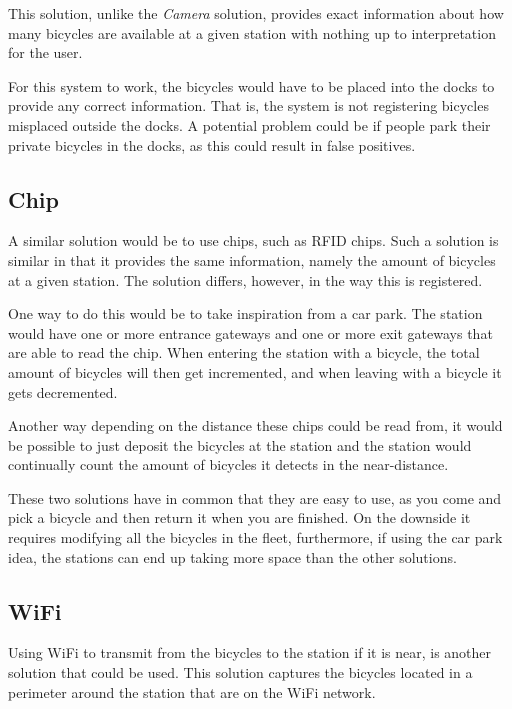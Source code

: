 This solution, unlike the \textit{Camera} solution, provides exact information about how many bicycles are available at a given station with nothing up to interpretation for the user.

For this system to work, the bicycles would have to be placed into the docks to provide any correct information.
That is, the system is not registering bicycles misplaced outside the docks.
A potential problem could be if people park their private bicycles in the docks, as this could result in false positives.

\subsection{Chip}
A similar solution would be to use chips, such as RFID chips. 
Such a solution is similar in that it provides the same information, namely the amount of bicycles at a given station.
The solution differs, however, in the way this is registered.

One way to do this would be to take inspiration from a car park.
The station would have one or more entrance gateways and one or more exit gateways that are able to read the chip.
When entering the station with a bicycle, the total amount of bicycles will then get incremented, and when leaving with a bicycle it gets decremented.

Another way depending on the distance these chips could be read from, it would be possible to just deposit the bicycles at the station and the station would continually count the amount of bicycles it detects in the near-distance.

These two solutions have in common that they are easy to use, as you come and pick a bicycle and then return it when you are finished.
On the downside it requires modifying all the bicycles in the fleet, furthermore, if using the car park idea, the stations can end up taking more space than the other solutions. 

\subsection{WiFi}
Using WiFi to transmit from the bicycles to the station if it is near, is another solution that could be used.
This solution captures the bicycles located in a perimeter around the station that are on the WiFi network.

